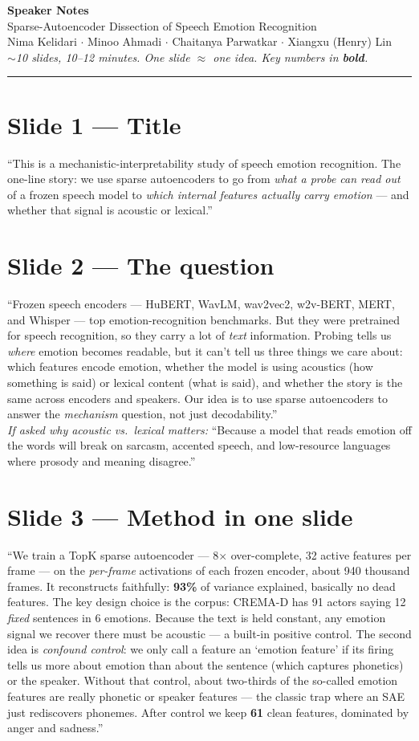 \documentclass[11pt]{article}
\newcommand{\slide}[1]{\section{#1}}
\begin{document}
\begin{center}
{\LARGE\bfseries\color{navy} Speaker Notes}\\[2pt]
{\large Sparse-Autoencoder Dissection of Speech Emotion Recognition}\\[2pt]
{\small Nima Kelidari $\cdot$ Minoo Ahmadi $\cdot$ Chaitanya Parwatkar $\cdot$ Xiangxu (Henry) Lin}\\[2pt]
{\small\itshape $\sim$10 slides, 10--12 minutes. One slide $\approx$ one idea. Key numbers in \textbf{bold}.}
\end{center}
\vspace{4pt}\hrule

\slide{Slide 1 --- Title}
``This is a mechanistic-interpretability study of speech emotion recognition. The one-line story: we use sparse autoencoders to go from \emph{what a probe can read out} of a frozen speech model to \emph{which internal features actually carry emotion} --- and whether that signal is acoustic or lexical.''

\slide{Slide 2 --- The question}
``Frozen speech encoders --- HuBERT, WavLM, wav2vec2, w2v-BERT, MERT, and Whisper --- top emotion-recognition benchmarks. But they were pretrained for speech recognition, so they carry a lot of \emph{text} information. Probing tells us \emph{where} emotion becomes readable, but it can't tell us three things we care about: which features encode emotion, whether the model is using acoustics (how something is said) or lexical content (what is said), and whether the story is the same across encoders and speakers. Our idea is to use sparse autoencoders to answer the \emph{mechanism} question, not just decodability.''\\
\textit{If asked why acoustic vs.\ lexical matters:} ``Because a model that reads emotion off the words will break on sarcasm, accented speech, and low-resource languages where prosody and meaning disagree.''

\slide{Slide 3 --- Method in one slide}
``We train a TopK sparse autoencoder --- 8$\times$ over-complete, 32 active features per frame --- on the \emph{per-frame} activations of each frozen encoder, about 940 thousand frames. It reconstructs faithfully: \textbf{93\%} of variance explained, basically no dead features. The key design choice is the corpus: CREMA-D has 91 actors saying 12 \emph{fixed} sentences in 6 emotions. Because the text is held constant, any emotion signal we recover there must be acoustic --- a built-in positive control. The second idea is \emph{confound control}: we only call a feature an `emotion feature' if its firing tells us more about emotion than about the sentence (which captures phonetics) or the speaker. Without that control, about two-thirds of the so-called emotion features are really phonetic or speaker features --- the classic trap where an SAE just rediscovers phonemes. After control we keep \textbf{61} clean features, dominated by anger and sadness.''
\end{document}
